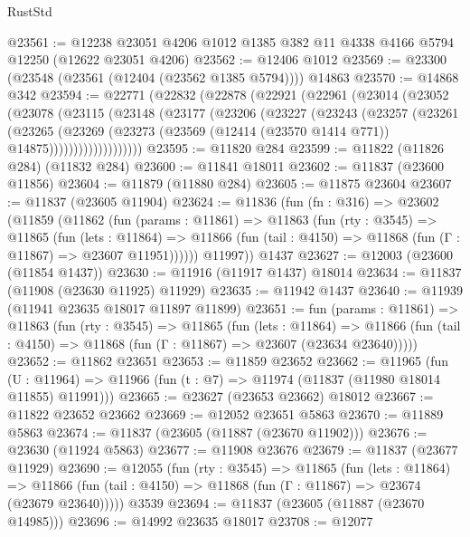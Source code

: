 \begin{lexlean}{RustStd}
\begin{coremodule}
{\begin{coremodule}
{{{{{{{{{{{{{{{{{{{{{{{{{{{{{{{{{{{{{{{{{{{{{{{{{{@23561 := @12238 @23051 @4206 @1012 @1385 @382 @11 @4338 @4166 @5794 @12250 (@12622 @23051 @4206)
@23562 := @12406 @1012
@23569 := @23300 (@23548 (@23561 (@12404 (@23562 @1385 @5794)))) @14863
@23570 := @14868 @342
@23594 := @22771
    (@22832
      (@22878
        (@22921
          (@22961
            (@23014
              (@23052
                (@23078
                  (@23115
                    (@23148
                      (@23177
                        (@23206
                          (@23227
                            (@23243
                              (@23257
                                (@23261
                                  (@23265
                                    (@23269
                                      (@23273
                                        (@23569
                                          (@12414 (@23570 @1414 @771))
                                          @14875)))))))))))))))))))
@23595 := @11820 @284
@23599 := @11822 (@11826 @284) (@11832 @284)
@23600 := @11841 @18011
@23602 := @11837 (@23600 @11856)
@23604 := @11879 (@11880 @284)
@23605 := @11875 @23604
@23607 := @11837 (@23605 @11904)
@23624 := @11836
    (fun (fn : @316) =>
    @23602
      (@11859
        (@11862
          (fun (params : @11861) =>
          @11863
            (fun (rty : @3545) =>
            @11865
              (fun (lets : @11864) =>
              @11866 (fun (tail : @4150) => @11868 (fun (Γ : @11867) => @23607 @11951))))))
        @11997))
    @1437
@23627 := @12003 (@23600 (@11854 @1437))
@23630 := @11916 (@11917 @1437) @18014
@23634 := @11837 (@11908 (@23630 @11925) @11929)
@23635 := @11942 @1437
@23640 := @11939 (@11941 @23635 @18017 @11897 @11899)
@23651 := fun (params : @11861) =>
  @11863
    (fun (rty : @3545) =>
    @11865
      (fun (lets : @11864) =>
      @11866 (fun (tail : @4150) => @11868 (fun (Γ : @11867) => @23607 (@23634 @23640)))))
@23652 := @11862 @23651
@23653 := @11859 @23652
@23662 := @11965
    (fun (U : @11964) => @11966 (fun (t : @7) => @11974 (@11837 (@11980 @18014 @11855) @11991)))
@23665 := @23627 (@23653 @23662) @18012
@23667 := @11822 @23652 @23662
@23669 := @12052 @23651 @5863
@23670 := @11889 @5863
@23674 := @11837 (@23605 (@11887 (@23670 @11902)))
@23676 := @23630 (@11924 @5863)
@23677 := @11908 @23676
@23679 := @11837 (@23677 @11929)
@23690 := @12055
    (fun (rty : @3545) =>
    @11865
      (fun (lets : @11864) =>
      @11866 (fun (tail : @4150) => @11868 (fun (Γ : @11867) => @23674 (@23679 @23640)))))
    @3539
@23694 := @11837 (@23605 (@11887 (@23670 @14985)))
@23696 := @14992 @23635 @18017
@23708 := @12077
}}}}}}}}}}}}}}}}}}}}}}}}}}}}}}}}}}}}}}}}}}}}}}}}}}
\end{coremodule}}
\end{coremodule}
\end{lexlean}
